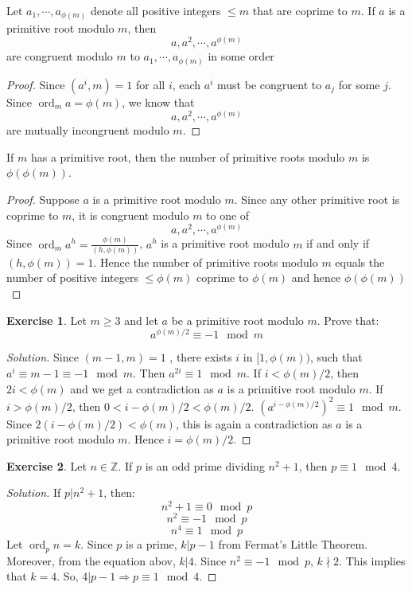 \documentclass[12pt,letterpaper]{book}
\theoremstyle{definition}
\newtheorem*{exercise}{Exercise}
\newenvironment{solution}
  {\renewcommand\qedsymbol{$\blacksquare$}\begin{proof}[Solution]}
  {\end{proof}}
\newcommand{\Z}{\mathbb{Z}}
\DeclareMathOperator{\ord}{ord}
\begin{document}
\begin{theorem}
  Let $a_1, \cdots, a_{\phi(m)}$ denote all positive integers $\leq m$ that are coprime to $m$. If $a$ is a primitive root modulo $m$, then 
  \[a,a^2, \cdots, a^{\phi(m)}\]
  are congruent modulo $m$ to $a_1, \cdots, a_{\phi(m)}$ in some order
\end{theorem}
\begin{proof}
  Since $(a^i, m) = 1$ for all $i$, each $a^i$ must be congruent to $a_j$ for some $j$. Since $\ord_m a = \phi(m)$, we know that 
  \[a, a^2, \cdots, a^{\phi(m)}\]
  are mutually incongruent modulo $m$.
\end{proof}

\begin{corollary}
  If $m$ has a primitive root, then the number of primitive roots modulo $m$ is $\phi(\phi(m))$.
\end{corollary}
\begin{proof}
  Suppose $a$ is a primitive root modulo $m$. Since any other primitive root is coprime to $m$, it is congruent modulo $m$ to one of
  \[a,a^2,\cdots, a^{\phi(m)}\]
  Since $\ord_m a^h = \frac{\phi(m)}{(h,\phi(m))}$, $a^h$ is a primitive root modulo $m$ if and only if $(h, \phi(m)) = 1$. Hence the number of primitive roots modulo $m$ equals the number of positive integers $\leq \phi(m)$ coprime to $\phi(m)$ and hence $\phi(\phi(m))$
\end{proof}

\begin{exercise}
  Let $m \geq 3$ and let $a$ be a primitive root modulo $m$. Prove that:
  \[a^{\phi(m)/2} \equiv -1 \mod m\]
\end{exercise}
\begin{solution}
  Since $(m-1,m) = 1$  , there exists $i$ in $[1,\phi(m))$, such that $a^i \equiv m-1 \equiv -1 \mod m$. Then $a^{2i} \equiv 1 \mod m$. If $i < \phi(m)/2$, then $2i < \phi(m)$ and we get a contradiction as $a$ is a primitive root modulo $m$. If $i > \phi(m)/2$, then $0 < i-\phi(m)/2 < \phi(m)/2$. $(a^{i - \phi(m)/2})^2 \equiv 1 \mod m$. Since $2(i - \phi(m)/2) < \phi(m)$, this is again a contradiction as $a$ is a primitive root modulo $m$. Hence $i = \phi(m)/2$.
\end{solution}

\begin{exercise}
  Let $n \in \Z$. If $p$ is an odd prime dividing $n^2+1$, then $p \equiv 1 \mod 4$. 
\end{exercise}
\begin{solution}
  If $p | n^2+1$, then:
  \[n^2 + 1 \equiv 0 \mod p\]
  \[n^2 \equiv -1 \mod p\]
  \[n^4 \equiv 1 \mod p\]
  Let $\ord_p n = k$. Since $p$ is a prime, $k | p-1$ from Fermat's Little Theorem. Moreover, from the equation abov, $k|4$. Since $n^2 \equiv -1 \mod p$, $k \nmid 2$. This implies that $k = 4$. So, $4 | p-1 \Rightarrow p \equiv 1 \mod 4$.
\end{solution}
\end{document}
